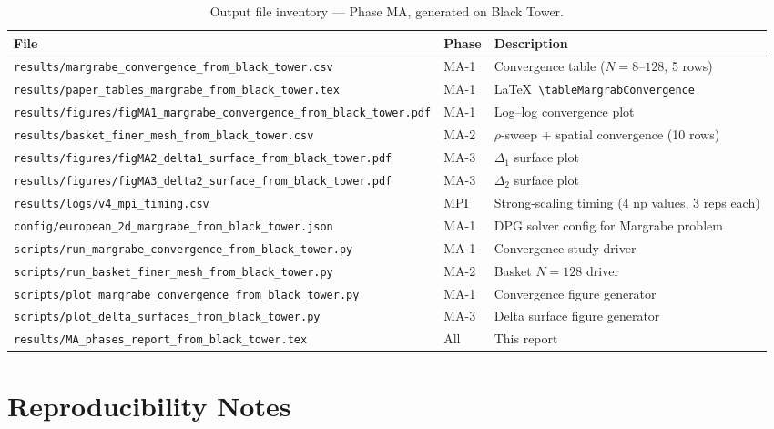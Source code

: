 \documentclass[11pt,a4paper]{article}
\newcommand{\machinename}{Black Tower}
\begin{document}
\begin{table}[H]
\centering
\caption{Output file inventory — Phase MA, generated on \machinename.}
\begin{tabular}{llp{6cm}}
\toprule
File & Phase & Description \\
\midrule
\texttt{results/margrabe\_convergence\_from\_black\_tower.csv}
  & MA-1 & Convergence table ($N=8$--$128$, 5 rows) \\
\texttt{results/paper\_tables\_margrabe\_from\_black\_tower.tex}
  & MA-1 & \LaTeX\ \texttt{\textbackslash tableMargrabConvergence} \\
\texttt{results/figures/figMA1\_margrabe\_convergence\_from\_black\_tower.pdf}
  & MA-1 & Log--log convergence plot \\
\texttt{results/basket\_finer\_mesh\_from\_black\_tower.csv}
  & MA-2 & $\rho$-sweep + spatial convergence (10 rows) \\
\texttt{results/figures/figMA2\_delta1\_surface\_from\_black\_tower.pdf}
  & MA-3 & $\Delta_1$ surface plot \\
\texttt{results/figures/figMA3\_delta2\_surface\_from\_black\_tower.pdf}
  & MA-3 & $\Delta_2$ surface plot \\
\texttt{results/logs/v4\_mpi\_timing.csv}
  & MPI  & Strong-scaling timing (4 np values, 3 reps each) \\
\texttt{config/european\_2d\_margrabe\_from\_black\_tower.json}
  & MA-1 & DPG solver config for Margrabe problem \\
\texttt{scripts/run\_margrabe\_convergence\_from\_black\_tower.py}
  & MA-1 & Convergence study driver \\
\texttt{scripts/run\_basket\_finer\_mesh\_from\_black\_tower.py}
  & MA-2 & Basket $N=128$ driver \\
\texttt{scripts/plot\_margrabe\_convergence\_from\_black\_tower.py}
  & MA-1 & Convergence figure generator \\
\texttt{scripts/plot\_delta\_surfaces\_from\_black\_tower.py}
  & MA-3 & Delta surface figure generator \\
\texttt{results/MA\_phases\_report\_from\_black\_tower.tex}
  & All  & This report \\
\bottomrule
\end{tabular}
\end{table}

\section{Reproducibility Notes}
\end{document}
